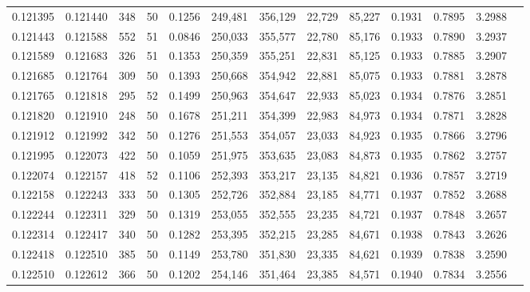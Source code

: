 \begin{tabular}{rrrrrrrrrrrrr}
0.121395 & 0.121440 &   348 &  50 &                                     0.1256 & 249,481 & 356,129 &  22,729 &  85,227 & 0.1931 & 0.7895 & 3.2988 \\
0.121443 & 0.121588 &   552 &  51 &                                     0.0846 & 250,033 & 355,577 &  22,780 &  85,176 & 0.1933 & 0.7890 & 3.2937 \\
0.121589 & 0.121683 &   326 &  51 &                                     0.1353 & 250,359 & 355,251 &  22,831 &  85,125 & 0.1933 & 0.7885 & 3.2907 \\
0.121685 & 0.121764 &   309 &  50 &                                     0.1393 & 250,668 & 354,942 &  22,881 &  85,075 & 0.1933 & 0.7881 & 3.2878 \\
0.121765 & 0.121818 &   295 &  52 &                                     0.1499 & 250,963 & 354,647 &  22,933 &  85,023 & 0.1934 & 0.7876 & 3.2851 \\
0.121820 & 0.121910 &   248 &  50 &                                     0.1678 & 251,211 & 354,399 &  22,983 &  84,973 & 0.1934 & 0.7871 & 3.2828 \\
0.121912 & 0.121992 &   342 &  50 &                                     0.1276 & 251,553 & 354,057 &  23,033 &  84,923 & 0.1935 & 0.7866 & 3.2796 \\
0.121995 & 0.122073 &   422 &  50 &                                     0.1059 & 251,975 & 353,635 &  23,083 &  84,873 & 0.1935 & 0.7862 & 3.2757 \\
0.122074 & 0.122157 &   418 &  52 &                                     0.1106 & 252,393 & 353,217 &  23,135 &  84,821 & 0.1936 & 0.7857 & 3.2719 \\
0.122158 & 0.122243 &   333 &  50 &                                     0.1305 & 252,726 & 352,884 &  23,185 &  84,771 & 0.1937 & 0.7852 & 3.2688 \\
0.122244 & 0.122311 &   329 &  50 &                                     0.1319 & 253,055 & 352,555 &  23,235 &  84,721 & 0.1937 & 0.7848 & 3.2657 \\
0.122314 & 0.122417 &   340 &  50 &                                     0.1282 & 253,395 & 352,215 &  23,285 &  84,671 & 0.1938 & 0.7843 & 3.2626 \\
0.122418 & 0.122510 &   385 &  50 &                                     0.1149 & 253,780 & 351,830 &  23,335 &  84,621 & 0.1939 & 0.7838 & 3.2590 \\
0.122510 & 0.122612 &   366 &  50 &                                     0.1202 & 254,146 & 351,464 &  23,385 &  84,571 & 0.1940 & 0.7834 & 3.2556 \\

\end{tabular}
